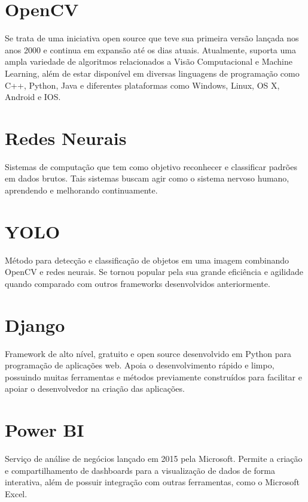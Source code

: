 \section{OpenCV}
\indent
\par Se trata de uma iniciativa open source que teve sua primeira versão lançada nos anos 2000 e continua em expansão até os dias atuais. Atualmente, suporta uma ampla variedade de algoritmos relacionados a Visão Computacional e Machine Learning, além de estar disponível em diversas linguagens de programação como C++, Python, Java e diferentes plataformas como Windows, Linux, OS X, Android e IOS.

\section{Redes Neurais}
\indent
\par Sistemas de computação que tem como objetivo reconhecer e classificar padrões em dados brutos. Tais sistemas buscam agir como o sistema nervoso humano, aprendendo e melhorando continuamente.

\section{YOLO}
\indent
\par Método para detecção e classificação de objetos em uma imagem combinando OpenCV e redes neurais. Se tornou popular pela sua grande eficiência e agilidade quando comparado com outros frameworks desenvolvidos anteriormente.

\section{Django}
\indent
\par Framework de alto nível, gratuito e open source desenvolvido em Python para programação de aplicações web. Apoia o desenvolvimento rápido e limpo, possuindo muitas ferramentas e métodos previamente construídos para facilitar e apoiar o desenvolvedor na criação das aplicações.

\section{Power BI}
\indent
\par Serviço de análise de negócios lançado em 2015 pela Microsoft. Permite a criação e compartilhamento de dashboards para a visualização de dados de forma interativa, além de possuir integração com outras ferramentas, como o Microsoft Excel.


